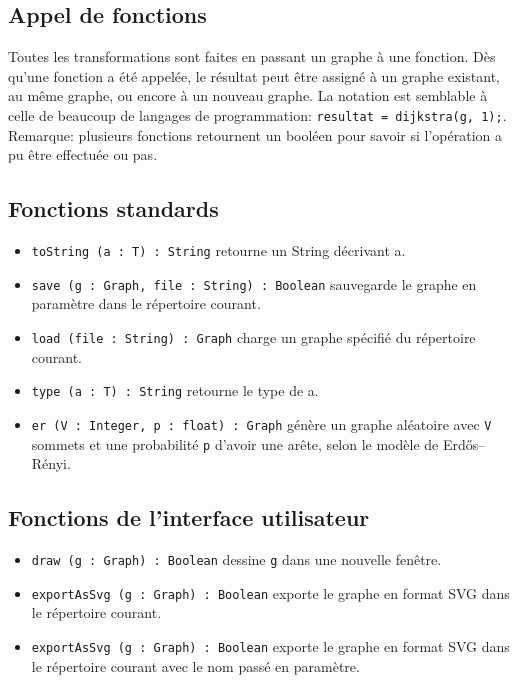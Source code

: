 \documentclass[french]{article}
\begin{document}
		\subsection{Appel de fonctions}
		Toutes les transformations sont faites en passant un graphe à une fonction. Dès qu'une fonction a été appelée, le résultat peut être assigné à un graphe existant, au même graphe, ou encore à un nouveau graphe. La notation est semblable à celle de beaucoup de langages de programmation: \texttt{resultat = dijkstra(g, 1);}. Remarque: plusieurs fonctions retournent un booléen pour savoir si l'opération a pu être effectuée ou pas.
		
		\subsection{Fonctions standards}
		\begin{itemize}
			\item \texttt{toString (a : T) : String} retourne un String décrivant a.
			\item \texttt{save (g : Graph, file : String) : Boolean} sauvegarde le graphe en paramètre dans le répertoire courant.
			\item \texttt{load (file : String) : Graph} charge un graphe spécifié du répertoire courant.
			\item \texttt{type (a : T) : String} retourne le type de a.
			\item \texttt{er (V : Integer, p : float) : Graph} génère un graphe aléatoire avec \texttt{V} sommets et une probabilité \texttt{p} d'avoir une arête, selon le modèle de Erdős–Rényi.
		\end{itemize}
		
		\subsection{Fonctions de l'interface utilisateur}
		\begin{itemize}
			\item \texttt{draw (g : Graph) : Boolean} dessine \texttt{g} dans une nouvelle fenêtre.
			\item \texttt{exportAsSvg (g : Graph) : Boolean} exporte le graphe en format SVG dans le répertoire courant.
			\item \texttt{exportAsSvg (g : Graph) : Boolean} exporte le graphe en format SVG dans le répertoire courant avec le nom passé en paramètre.
		\end{itemize}
		
\end{document}
